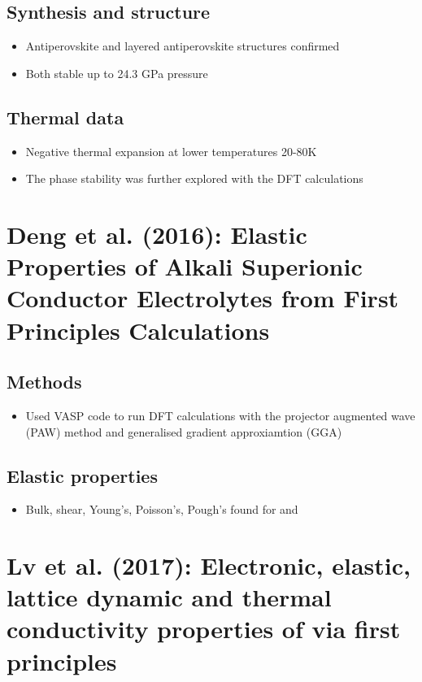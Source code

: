 \documentclass[10pt,a4paper, titlepage]{article}
\begin{document}
\subsection{Synthesis and structure}

\begin{itemize}
  \item Antiperovskite and layered antiperovskite structures confirmed
  \item Both stable up to 24.3 GPa pressure
\end{itemize}

\subsection{Thermal data}

\begin{itemize}
  \item Negative thermal expansion at lower temperatures 20-80K
  \item The phase stability was further explored with the DFT calculations
\end{itemize}

\section{Deng et al. (2016): Elastic Properties of Alkali Superionic Conductor Electrolytes
from First Principles Calculations}

\subsection{Methods}

\begin{itemize}
  \item Used VASP code to run DFT calculations with the projector augmented wave (PAW) method and generalised gradient approxiamtion (GGA)
\end{itemize}

\subsection{Elastic properties}

\begin{itemize}
  \item Bulk, shear, Young's, Poisson's, Pough's found for  and 
\end{itemize}

\section{Lv et al. (2017): Electronic, elastic, lattice dynamic and thermal conductivity properties of  via ﬁrst principles}
\end{document}
